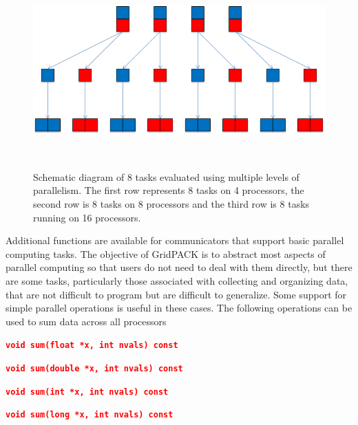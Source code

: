 \documentclass[12pt]{report} %
\begin{document}
\begin{figure}
  \centering
    \includegraphics*[width=5.52in, height=2.95in, keepaspectratio=true]{Fig11}
  \caption{ Schematic diagram of 8 tasks evaluated using multiple levels of parallelism. The first row represents 8 tasks on 4 processors, the second row is 8 tasks on 8 processors and the third row is 8 tasks running on 16 processors.}
  \label{fig:fig-11}
\end{figure}



Additional functions are available for communicators that support basic parallel computing tasks. The objective of GridPACK is to abstract most aspects of parallel computing so that users do not need to deal with them directly, but there are some tasks, particularly those associated with collecting and organizing data, that are not difficult to program but are difficult to generalize. Some support for simple parallel operations is useful in these cases. The following operations can be used to sum data across all processors

\textcolor{red}{\texttt{\textbf{void sum(float *x, int nvals) const}}}

\textcolor{red}{\texttt{\textbf{void sum(double *x, int nvals) const}}}

\textcolor{red}{\texttt{\textbf{void sum(int *x, int nvals) const}}}

\textcolor{red}{\texttt{\textbf{void sum(long *x, int nvals) const}}}
\end{document}
